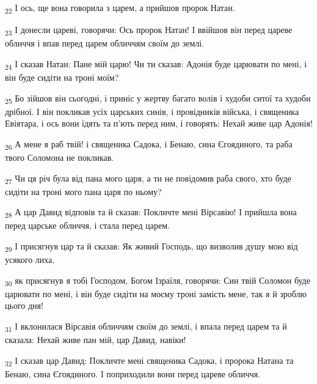 \begin{tcolorbox}
\textsubscript{22} І ось, ще вона говорила з царем, а прийшов пророк Натан.
\end{tcolorbox}
\begin{tcolorbox}
\textsubscript{23} І донесли цареві, говорячи: Ось пророк Натан! І ввійшов він перед цареве обличчя і впав перед царем обличчям своїм до землі.
\end{tcolorbox}
\begin{tcolorbox}
\textsubscript{24} І сказав Натан: Пане мій царю! Чи ти сказав: Адонія буде царювати по мені, і він буде сидіти на троні моїм?
\end{tcolorbox}
\begin{tcolorbox}
\textsubscript{25} Бо зійшов він сьогодні, і приніс у жертву багато волів і худоби ситої та худоби дрібної. І він покликав усіх царських синів, і провідників війська, і священика Евіятара, і ось вони їдять та п'ють перед ним, і говорять: Нехай живе цар Адонія!
\end{tcolorbox}
\begin{tcolorbox}
\textsubscript{26} А мене я раб твій! і священика Садока, і Бенаю, сина Єгоядиного, та раба твого Соломона не покликав.
\end{tcolorbox}
\begin{tcolorbox}
\textsubscript{27} Чи ця річ була від пана мого царя, а ти не повідомив раба свого, хто буде сидіти на троні мого пана царя по ньому?
\end{tcolorbox}
\begin{tcolorbox}
\textsubscript{28} А цар Давид відповів та й сказав: Покличте мені Вірсавію! І прийшла вона перед царське обличчя, і стала перед царем.
\end{tcolorbox}
\begin{tcolorbox}
\textsubscript{29} І присягнув цар та й сказав: Як живий Господь, що визволив душу мою від усякого лиха,
\end{tcolorbox}
\begin{tcolorbox}
\textsubscript{30} як присягнув я тобі Господом, Богом Ізраїля, говорячи: Син твій Соломон буде царювати по мені, і він буде сидіти на моєму троні замість мене, так я й зроблю цього дня!
\end{tcolorbox}
\begin{tcolorbox}
\textsubscript{31} І вклонилася Вірсавія обличчям своїм до землі, і впала перед царем та й сказала: Нехай живе пан мій, цар Давид, навіки!
\end{tcolorbox}
\begin{tcolorbox}
\textsubscript{32} І сказав цар Давид: Покличте мені священика Садока, і пророка Натана та Бенаю, сина Єгоядиного. І поприходили вони перед цареве обличчя.
\end{tcolorbox}
